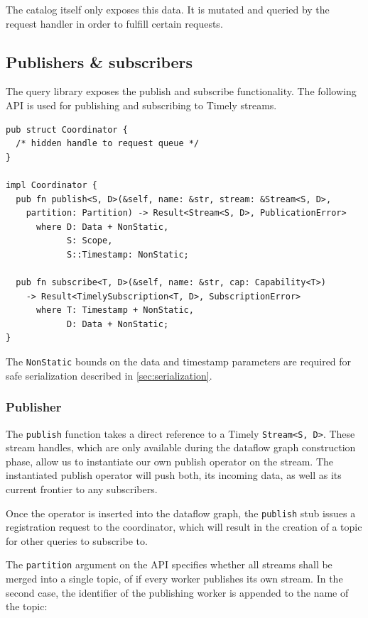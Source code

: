 The catalog itself only exposes this data. It is mutated and queried by the
request handler in order to fulfill certain requests.



\subsection{Publishers \& subscribers} \label{sec:pubsubimpl}

The query library exposes the publish and subscribe functionality. The following
API is used for publishing and subscribing to Timely streams.

\begin{lstlisting}[caption={[Publish \& subscribe interface]
The interface for publishing and subscribing Timely streams.
}]
pub struct Coordinator {
  /* hidden handle to request queue */
}

impl Coordinator {
  pub fn publish<S, D>(&self, name: &str, stream: &Stream<S, D>,
    partition: Partition) -> Result<Stream<S, D>, PublicationError>
      where D: Data + NonStatic, 
            S: Scope,
            S::Timestamp: NonStatic;

  pub fn subscribe<T, D>(&self, name: &str, cap: Capability<T>) 
    -> Result<TimelySubscription<T, D>, SubscriptionError>
      where T: Timestamp + NonStatic, 
            D: Data + NonStatic;
}
\end{lstlisting}

The \lstinline{NonStatic} bounds on the data and timestamp
parameters are required for safe serialization described in \ref{sec:serialization}.

\subsubsection{Publisher}

The \lstinline{publish} function takes a direct reference to a Timely
\lstinline{Stream<S, D>}. These stream handles, which are only available during
the dataflow graph construction phase, allow us to instantiate our own publish
operator on the stream.  The instantiated publish operator will push both, its
incoming data, as well as its current frontier to any subscribers. 

Once the operator is inserted into the dataflow graph, the \lstinline{publish}
stub issues a registration request to the coordinator, which will result in the
creation of a topic for other queries to subscribe to.

The \lstinline{partition} argument on the API specifies whether all streams
shall be merged into a single topic, of if every worker publishes its own stream.
In the second case, the identifier of the publishing worker is appended to the
name of the topic:

